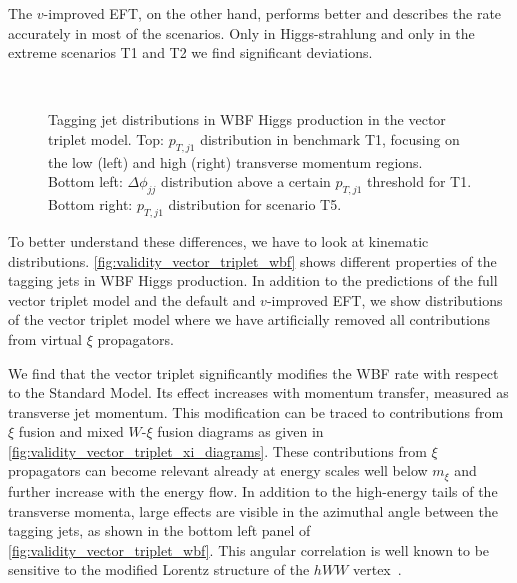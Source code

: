 The $v$-improved EFT, on the other hand, performs better and describes
the rate accurately in most of the scenarios. Only in Higgs-strahlung
and only in the extreme scenarios T1 and T2 we find significant
deviations. 

\begin{figure}
  \\%
  \caption{Tagging jet distributions in WBF Higgs production in the
    vector triplet model.  Top: $p_{T,j1}$ distribution in benchmark
    T1, focusing on the low (left) and high (right) transverse
    momentum regions.  Bottom left: $\Delta \phi_{jj}$ distribution
    above a certain $p_{T,j1}$ threshold for T1.  Bottom right:
    $p_{T,j1}$ distribution for scenario T5.}
  \label{fig:validity_vector_triplet_wbf}
\end{figure}

To better understand these differences, we have to look at kinematic
distributions. \autoref{fig:validity_vector_triplet_wbf} shows
different properties of the tagging jets in WBF Higgs production. In
addition to the predictions of the full vector triplet model and the
default and $v$-improved EFT, we show distributions of the vector
triplet model where we have artificially removed all contributions
from virtual $\xi$ propagators.

We find that the vector triplet significantly modifies the WBF rate
with respect to the Standard Model. Its effect increases with momentum
transfer, measured as transverse jet momentum. This modification can
be traced to contributions from $\xi$ fusion and mixed $W$-$\xi$
fusion diagrams as given in
\autoref{fig:validity_vector_triplet_xi_diagrams}. These contributions
from $\xi$ propagators can become relevant already at energy scales
well below $m_\xi$ and further increase with the energy flow. In
addition to the high-energy tails of the transverse momenta, large
effects are visible in the azimuthal angle between the tagging jets,
as shown in the bottom left panel of
\autoref{fig:validity_vector_triplet_wbf}. This angular correlation is
well known to be sensitive to the modified Lorentz structure of the
$hWW$ vertex~\cite{Eboli:2000ze, Plehn:2001nj, Hankele:2006ma,
  Hagiwara:2009wt, Englert:2012xt, Buckley:2014fqa, Brehmer:2014pka}.

